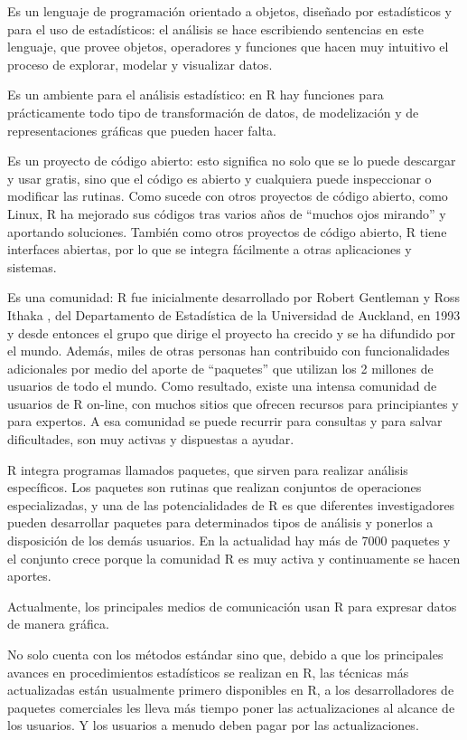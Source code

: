 \documentclass[]{book}
\begin{document}
Es un lenguaje de programación orientado a objetos, diseñado por estadísticos y para el uso de estadísticos: el análisis se hace escribiendo sentencias en este lenguaje, que provee objetos, operadores y funciones que hacen muy intuitivo el proceso de explorar, modelar y visualizar datos.

Es un ambiente para el análisis estadístico: en R hay funciones para prácticamente todo tipo de transformación de datos, de modelización y de representaciones gráficas que pueden hacer falta.

Es un proyecto de código abierto: esto significa no solo que se lo puede descargar y usar gratis, sino que el código es abierto y cualquiera puede inspeccionar o modificar las rutinas. Como sucede con otros proyectos de código abierto, como Linux, R ha mejorado sus códigos tras varios años de ``muchos ojos mirando'' y aportando soluciones. También como otros proyectos de código abierto, R tiene interfaces abiertas, por lo que se integra fácilmente a otras aplicaciones y sistemas.

Es una comunidad: R fue inicialmente desarrollado por Robert Gentleman y Ross Ithaka , del Departamento de Estadística de la Universidad de Auckland, en 1993 y desde entonces el grupo que dirige el proyecto ha crecido y se ha difundido por el mundo. Además, miles de otras personas han contribuido con funcionalidades adicionales por medio del aporte de ``paquetes'' que utilizan los 2 millones de usuarios de todo el mundo. Como resultado, existe una intensa comunidad de usuarios de R on-line, con muchos sitios que ofrecen recursos para principiantes y para expertos. A esa comunidad se puede recurrir para consultas y para salvar dificultades, son muy activas y dispuestas a ayudar.

R integra programas llamados paquetes, que sirven para realizar análisis específicos. Los paquetes son rutinas que realizan conjuntos de operaciones especializadas, y una de las potencialidades de R es que diferentes investigadores pueden desarrollar paquetes para determinados tipos de análisis y ponerlos a disposición de los demás usuarios. En la actualidad hay más de 7000 paquetes y el conjunto crece porque la comunidad R es muy activa y continuamente se hacen aportes.

Actualmente, los principales medios de comunicación usan R para expresar datos de manera gráfica.

No solo cuenta con los métodos estándar sino que, debido a que los principales avances en procedimientos estadísticos se realizan en R, las técnicas más actualizadas están usualmente primero disponibles en R, a los desarrolladores de paquetes comerciales les lleva más tiempo poner las actualizaciones al alcance de los usuarios. Y los usuarios a menudo deben pagar por las actualizaciones.
\end{document}
